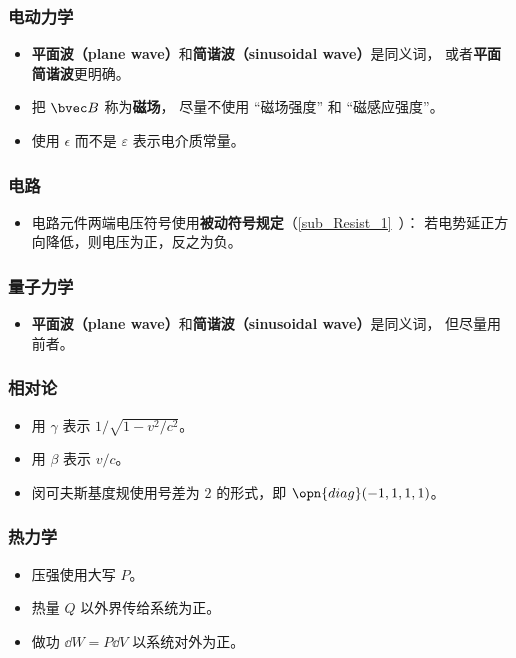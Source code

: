 \subsubsection{电动力学}
\begin{itemize}
\item \textbf{平面波（plane wave）}和\textbf{简谐波（sinusoidal wave）}是同义词， 或者\textbf{平面简谐波}更明确。
\item 把 $\bvec B$ 称为\textbf{磁场}， 尽量不使用 “磁场强度” 和 “磁感应强度”。
\item 使用 $\epsilon$ 而不是 $\varepsilon$ 表示电介质常量。
\end{itemize}

\subsubsection{电路}
\begin{itemize}
\item 电路元件两端电压符号使用\textbf{被动符号规定}（\autoref{sub_Resist_1}~）： 若电势延正方向降低，则电压为正，反之为负。
\end{itemize}

\subsubsection{量子力学}
\begin{itemize}
\item \textbf{平面波（plane wave）}和\textbf{简谐波（sinusoidal wave）}是同义词， 但尽量用前者。
\end{itemize}

\subsubsection{相对论}
\begin{itemize}
\item 用 $\gamma$ 表示 $1/\sqrt{1 - v^2/c^2}$。
\item 用 $\beta$ 表示 $v/c$。
\item 闵可夫斯基度规使用号差为 $2$ 的形式，即 $\opn{diag}(-1, 1, 1, 1)$。
\end{itemize}

\subsubsection{热力学}
\begin{itemize}
\item 压强使用大写 $P$。
\item 热量 $Q$ 以外界传给系统为正。
\item 做功 $\dd{W} = P\dd{V}$ 以系统对外为正。
\end{itemize}

